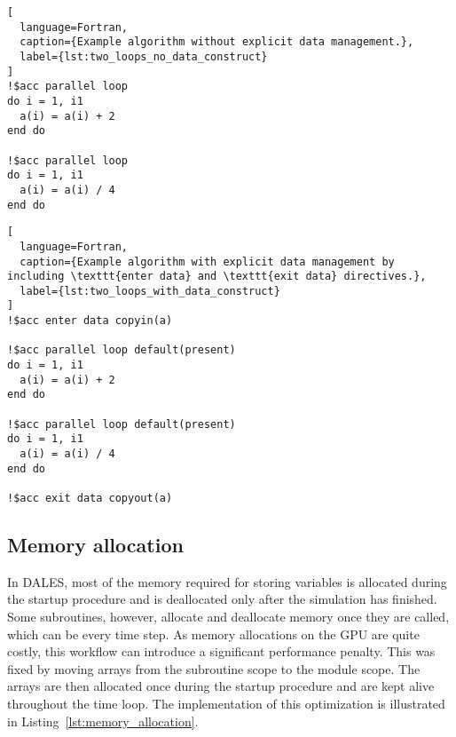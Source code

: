 \begin{lstlisting}[
  language=Fortran,
  caption={Example algorithm without explicit data management.},
  label={lst:two_loops_no_data_construct}
]
!$acc parallel loop
do i = 1, i1
  a(i) = a(i) + 2
end do

!$acc parallel loop
do i = 1, i1
  a(i) = a(i) / 4
end do
\end{lstlisting}

\begin{lstlisting}[
  language=Fortran,
  caption={Example algorithm with explicit data management by including \texttt{enter data} and \texttt{exit data} directives.},
  label={lst:two_loops_with_data_construct}
]
!$acc enter data copyin(a)

!$acc parallel loop default(present)
do i = 1, i1
  a(i) = a(i) + 2
end do

!$acc parallel loop default(present)
do i = 1, i1
  a(i) = a(i) / 4
end do

!$acc exit data copyout(a)
\end{lstlisting}

\subsection{Memory allocation}
In DALES, most of the memory required for storing variables is allocated during the startup procedure and is deallocated only after the simulation has finished. Some subroutines, however, allocate and deallocate memory once they are called, which can be every time step. As memory allocations on the GPU are quite costly, this workflow can introduce a significant performance penalty. This was fixed by moving arrays from the subroutine scope to the module scope. The arrays are then allocated once during the startup procedure and are kept alive throughout the time loop. The implementation of this optimization is illustrated in Listing~\ref{lst:memory_allocation}. 

